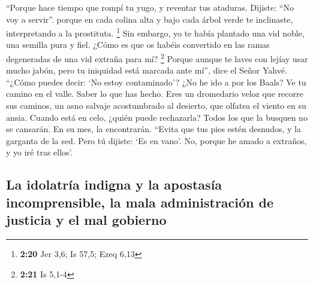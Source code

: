 \begin{paracol}{2}
 ``Porque hace tiempo que rompí tu yugo, y reventar tus
ataduras. Dijiste: ``No voy a servir''. porque en cada colina alta y
bajo cada árbol verde te inclinaste, interpretando a la prostituta.
\footnote{\textbf{2:20} Jer 3,6; Is 57,5; Ezeq 6,13}  Sin
embargo, yo te había plantado una vid noble, una semilla pura y fiel.
¿Cómo es que os habéis convertido en las ramas degeneradas de una vid
extraña para mí? \footnote{\textbf{2:21} Is 5,1-4} 
Porque aunque te laves con lejíay usar mucho jabón, pero tu iniquidad
está marcada ante mí'', dice el Señor Yahvé.  ``¿Cómo
puedes decir: `No estoy contaminado'? ¿No he ido a por los Baals? Ve tu
camino en el valle. Saber lo que has hecho. Eres un dromedario veloz que
recorre sus caminos,  un asno salvaje acostumbrado al
desierto, que olfatea el viento en su ansia. Cuando está en celo, ¿quién
puede rechazarla? Todos los que la busquen no se cansarán. En su mes, la
encontrarán.  ``Evita que tus pies estén desnudos, y la
garganta de la sed. Pero tú dijiste: `Es en vano'. No, porque he amado a
extraños, y yo iré tras ellos'.

\hypertarget{la-idolatruxeda-indigna-y-la-apostasuxeda-incomprensible-la-mala-administraciuxf3n-de-justicia-y-el-mal-gobierno}{%
\subsection{La idolatría indigna y la apostasía incomprensible, la mala
administración de justicia y el mal
gobierno}\label{la-idolatruxeda-indigna-y-la-apostasuxeda-incomprensible-la-mala-administraciuxf3n-de-justicia-y-el-mal-gobierno}}


\end{paracol}
